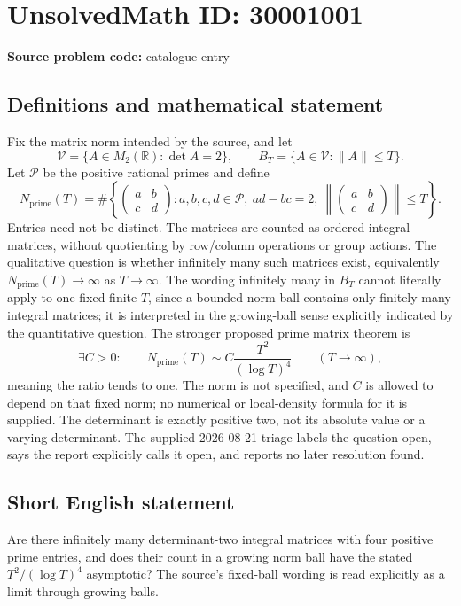 \documentclass[11pt]{article}
\newcommand{\R}{\mathbb{R}}
\begin{document}
\section*{UnsolvedMath ID: 30001001}
\textbf{Source problem code:} catalogue entry
\subsection{Definitions and mathematical statement}
Fix the matrix norm intended by the source, and let \[\mathcal V=\{A\in M_2(\R):\det A=2\},\qquad B_T=\{A\in\mathcal V:\|A\|\leq T\}.\] Let $\mathcal P$ be the positive rational primes and define \[N_{\mathrm{prime}}(T)=\#\left\{\begin{pmatrix}a&b\\c&d\end{pmatrix}:a,b,c,d\in\mathcal P,\ ad-bc=2,\ \left\|\begin{pmatrix}a&b\\c&d\end{pmatrix}\right\|\leq T\right\}.\] Entries need not be distinct. The matrices are counted as ordered integral matrices, without quotienting by row/column operations or group actions. The qualitative question is whether infinitely many such matrices exist, equivalently $N_{\mathrm{prime}}(T)\to\infty$ as $T\to\infty$. The wording infinitely many in $B_T$ cannot literally apply to one fixed finite $T$, since a bounded norm ball contains only finitely many integral matrices; it is interpreted in the growing-ball sense explicitly indicated by the quantitative question. The stronger proposed prime matrix theorem is \[\exists C>0:\qquad N_{\mathrm{prime}}(T)\sim C\frac{T^2}{(\log T)^4}\qquad(T\to\infty),\] meaning the ratio tends to one. The norm is not specified, and $C$ is allowed to depend on that fixed norm; no numerical or local-density formula for it is supplied. The determinant is exactly positive two, not its absolute value or a varying determinant. The supplied 2026-08-21 triage labels the question open, says the report explicitly calls it open, and reports no later resolution found.
\subsection{Short English statement}
Are there infinitely many determinant-two integral matrices with four positive prime entries, and does their count in a growing norm ball have the stated $T^2/(\log T)^4$ asymptotic? The source's fixed-ball wording is read explicitly as a limit through growing balls.
\end{document}

